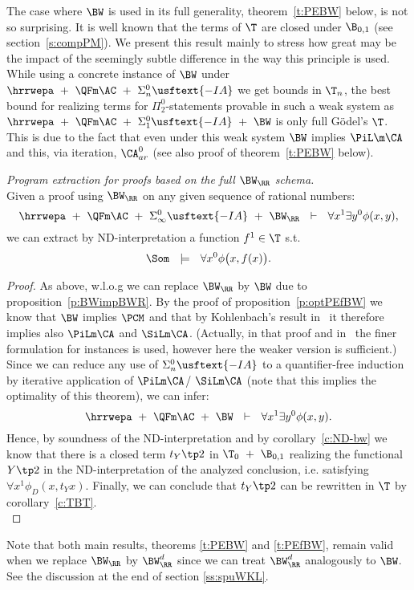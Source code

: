 
%
The case where $\BW$ is used in its full generality, theorem~\ref{t:PEBW} below,
is not so surprising. It is well known that the terms of
$\T$ are closed under $\B_{0,1}$ (see section~\ref{s:compPM}). We present this result
mainly to stress how great may be the impact of the seemingly subtle difference in the way
this principle is used.\\
 While using a concrete instance of $\BW$ under 
$\hrrwepa\ +\ \QFm\AC\ +\ \Sigma^0_n\usftext{-IA}$ we get bounds in $\T_n$, the best bound for
realizing terms for $\Pi^0_2$-statements
 provable in such a weak system as $\hrrwepa\ +\ \QFm\AC\ +\ \Sigma^0_1\usftext{-IA}\ +\ \BW$ 
is only full G\"odel's $\T$. This is due to the fact that even under this weak system $\BW$
implies $\PiL\m\CA$ and this, via iteration, $\CA^0_{ar}$ (see also proof of theorem~\ref{t:PEBW} below).
\begin{thm}{\em Program extraction for proofs based on the full $\BW_\RR$ schema.\\} 
\label{t:PEBW}
Given a proof 
using $\BW_\RR$ on any given sequence of rational numbers:
\[
\hrrwepa\ +\ \QFm\AC\ +\ \Sigma^0_\infty\usftext{-IA}\ +\ \BW_\RR\ \ \vdash\ \ 
    \forall x^1\exists y^0 \phi(x,y)
\text{,}
\]
we can extract by ND-interpretation a function $f^1\in\T$ s.t.
\[
\Som\ \ \models\ \ \forall x^0 \phi\big(x,f(x)\big) \text{.}
\]
\end{thm}
\begin{proof}
As above, w.l.o.g we can replace $\BW_\RR$ by $\BW$ due to proposition~\ref{p:BWimpBWR}.
By the proof of proposition~\ref{p:optPEfBW} we know that $\BW$ implies $\PCM$ and that by Kohlenbach's result
in~\cite{Kohlenbach00} it therefore implies also $\PiLm\CA$ and $\SiLm\CA$. (Actually, in that proof and in~\cite{Kohlenbach00}
the finer formulation for instances is used, however here the weaker version is sufficient.) Since we can reduce any use of $\Sigma^0_n\usftext{-IA}$
to a quantifier-free induction by iterative application of $\PiLm\CA$/ $\SiLm\CA$ (note that this implies the
optimality of this theorem), we can infer:
\[
\hrrwepa\ +\ \QFm\AC\ +\ \BW\ \ \vdash\ \ 
    \forall x^1\exists y^0 \phi(x,y)
\text{.}
\]
Hence, by soundness of the ND-interpretation and by corollary~\ref{c:ND-bw} 
we know that there is a closed term $t_Y\tp2$
in $\T_0\ +\ \B_{0,1}$ realizing the functional $Y\tp2$ in the 
ND-interpretation of the analyzed conclusion, i.e. satisfying
 $\forall x^1\phi_D(x,t_Yx)$. Finally, we can conclude that $t_Y\tp2$ can be
rewritten in $\T$ by corollary~\ref{c:TBT}.\\
\end{proof}
%

%
Note that both main results, theorems \ref{t:PEBW} and \ref{t:PEfBW}, remain valid when we replace $\BW_\RR$ by
$\BW^d_\RR$ since we can treat $\BW^d_\RR$ analogously to $\BW$. See the discussion at the end of section \ref{ss:spuWKL}.

